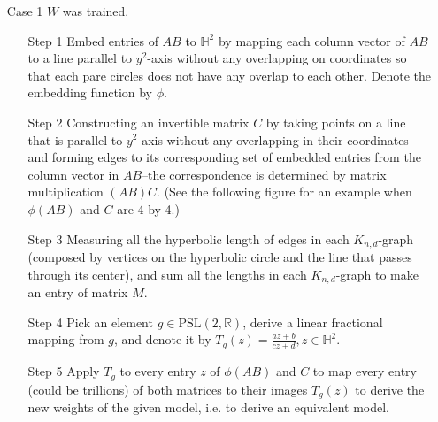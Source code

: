 \documentclass{article}
\theoremstyle{plain}
\theoremstyle{plain} %
\theoremstyle{definition}  %
\theoremstyle{remark}  %
\theoremstyle{plain}
\begin{document}
\begin{itemize}
\item[Case 1]$W$ was trained.
\begin{itemize}
\item[Step 1]
Embed entries of $AB$ to $\mathbb{H}^2$ by mapping each column vector of $AB$ to a line parallel to $y^2$-axis without any overlapping on coordinates so that each pare circles does not have any overlap to each other. Denote the embedding function by $\phi$.

\item[Step 2] Constructing an invertible matrix $C$ by taking points on a line that is parallel to $y^2$-axis without any overlapping in their coordinates and forming edges to its corresponding set of embedded entries from the column vector in $AB$--the correspondence is determined by matrix multiplication $(AB)C$. (See the following figure for an example when $\phi(AB)$ and $C$ are 4 by 4.)
\item[Step 3] Measuring all the hyperbolic length of edges in each $K_{n,d}$-graph (composed by vertices on the hyperbolic circle and the line that passes through its center), and sum all the lengths in each $K_{n,d}$-graph to make an entry of matrix $M$.

\item[Step 4] Pick an element $g\in\text{PSL}(2,\mathbb{R})$, derive a linear fractional mapping from $g$, and denote it by $T_g(z)=\frac{az+b}{cz+d}, z\in\mathbb{H}^2$. 
\item[Step 5] Apply $T_g$ to every entry $z$ of $\phi(AB)$ and $C$ to map every entry (could be trillions) of both matrices to their images $T_g(z)$ to derive the new weights of the given model, i.e. to derive an equivalent model.
\end{itemize}



\end{itemize}
\end{document}

